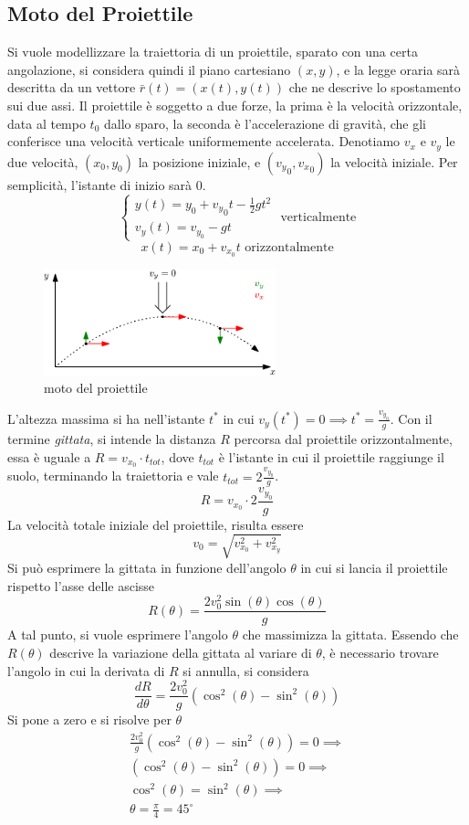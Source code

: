 \documentclass[10pt, letterpaper]{report}
\begin{document}
\subsection{Moto del Proiettile}
Si vuole modellizzare la traiettoria di un proiettile, sparato con una certa angolazione, si 
considera quindi il piano cartesiano $(x,y)$, e la legge oraria sarà descritta da un 
vettore $\bar r(t)=(x(t),y(t))$ che ne descrive lo spostamento sui due assi.\acc 
Il proiettile è soggetto a due forze, la prima è la velocità orizzontale, data al tempo 
$t_0$ dallo sparo, la seconda è l'accelerazione di gravità, che gli conferisce una velocità 
verticale uniformemente accelerata. Denotiamo $v_x$ e $v_y$ le due velocità, $(x_0,y_0)$ la 
posizione iniziale, e $({v_y}_0,{v_x}_0)$ la velocità iniziale. Per semplicità, l'istante di inizio 
sarà $0$.
$$\begin{cases}
    y(t)=y_0+{v_y}_0t-\frac{1}{2}gt^2\\ 
    v_y(t)=v_{y_0}-gt
\end{cases} \text{ verticalmente}$$
$$ x(t)=x_0+v_{x_0}t\text{ orizzontalmente}$$
\begin{center}
    \begin{figure}[h!]
        \centering
        \includegraphics[width=0.6\textwidth]{images/motoProiettile.eps}
        \caption{moto del proiettile}
        \label{fig:pro}
    \end{figure} 
\end{center}
L'altezza massima si ha nell'istante $t^*$ in cui $v_y(t^*)=0\implies t^*=\frac{v_{y_0}}{g}$.
Con il termine \textit{gittata}, si intende la distanza $R$ percorsa dal proiettile orizzontalmente, 
essa è uguale a $R=v_{x_0}\cdot t_{tot}$, dove $t_{tot}$ è l'istante in cui il proiettile raggiunge 
il suolo, terminando la traiettoria e vale $t_{tot}=2\frac{v_{y_0}}{g}$.
$$ R=v_{x_0}\cdot2\frac{v_{y_0}}{g}$$ La velocità totale iniziale del proiettile, risulta 
essere 
$$ v_0=\sqrt{v_{x_0}^2+v_{x_y}^2}$$
Si può esprimere la gittata in funzione dell'angolo $\theta$ in cui si lancia il proiettile rispetto 
l'asse delle ascisse 
$$ R(\theta)=\frac{2v_0^2\sin(\theta)\cos(\theta)}{g}$$
A tal punto, si vuole esprimere l'angolo $\theta$ che massimizza la gittata. Essendo che $R(\theta)$ descrive 
la variazione della gittata al variare di $\theta$, è necessario trovare l'angolo in cui la derivata 
di $R$ si annulla, si considera 
$$ \frac{dR}{d\theta}=\frac{2v_0^2}{g}(\cos^2(\theta)-\sin^2(\theta))$$
Si pone a zero e si risolve per $\theta$
\begin{eqnarray}
    \frac{2v_0^2}{g}(\cos^2(\theta)-\sin^2(\theta))=0 \implies\\ 
    (\cos^2(\theta)-\sin^2(\theta))=0\implies\\ 
    \cos^2(\theta)=\sin^2(\theta)\implies \\ 
    \theta = \frac{\pi}{4}=45^\circ
\end{eqnarray}
\end{document}
